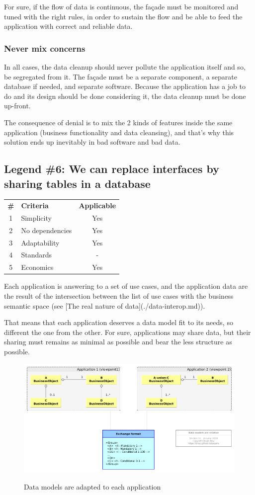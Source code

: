 \documentclass[]{article}
\newcommand{\criterias}[5]
{\begin{center}
\rowcolors{2}{gray!25}{white}
{\small\begin{tabular}{clc}
\rowcolor{gray!50}
\textbf{\#} & \textbf{Criteria} & \textbf{Applicable} \\
1 & Simplicity      & #1 \\
2 & No dependencies & #2 \\
3 & Adaptability    & #3 \\
4 & Standards       & #4 \\
5 & Economics       & #5 \\
\end{tabular}}
\end{center}}
\begin{document}
For sure, if the flow of data is continuous, the façade must be monitored and tuned with the right rules, in order to sustain the flow and be able to feed the application with correct and reliable data.

\subsubsection{Never mix concerns}

In all cases, the data cleanup should never pollute the application itself and so, be segregated from it. The façade must be a separate component, a separate database if needed, and separate software. Because the application has a job to do and its design should be done considering it, the data cleanup must be done up-front.

The consequence of denial is to mix the 2 kinds of features inside the same application (business functionality and data cleansing), and that's why this solution ends up inevitably in bad software and bad data.

\subsection{Legend \#6: We can replace interfaces by sharing tables in a database}

\criterias{Yes}{Yes}{Yes}{-}{Yes}

Each application is answering to a set of use cases, and the application data are the result of the intersection between the list of use cases with the business semantic space (see [The real nature of data](./data-interop.md)).

That means that each application deserves a data model fit to its needs, so different the one from the other. For sure, applications may share data, but their sharing must remains as minimal as possible and bear the less structure as possible.

\begin{figure}[t]
\caption{Data models are adapted to each application}
\includegraphics[width=\textwidth]{stubs01.png}
\label{fig:data-interop}
\end{figure}
\end{document}
